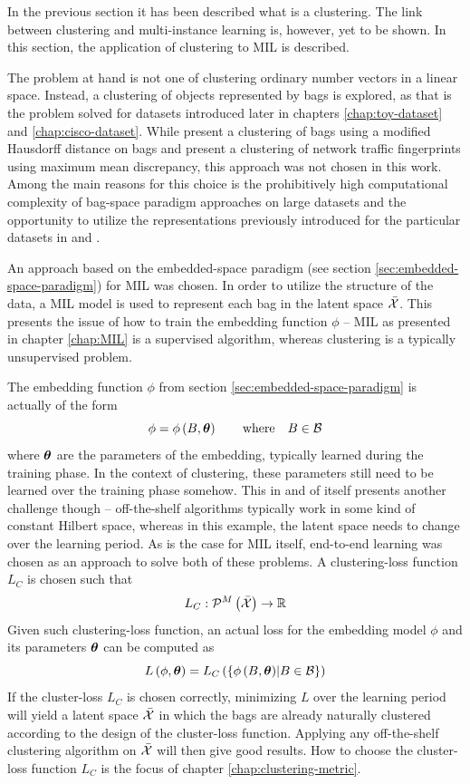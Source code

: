 In the previous section it has been described what is a clustering. The link between clustering and multi-instance learning is, however, yet to be shown. In this section, the application of clustering to MIL is described.

The problem at hand is not one of clustering ordinary number vectors in a linear space. Instead, a clustering of objects represented by bags is explored, as that is the problem solved for datasets introduced later in chapters \ref{chap:toy-dataset} and \ref{chap:cisco-dataset}. While \cite{wang_solving_2000} present a clustering of bags using a modified Hausdorff distance on bags and \cite{kohout_network_2018} present a clustering of network traffic fingerprints using maximum mean discrepancy, this approach was not chosen in this work. Among the main reasons for this choice is the prohibitively high computational complexity of bag-space paradigm approaches on large datasets and the opportunity to utilize the representations previously introduced for the particular datasets in \cite{dedic_hierarchicke_2017} and \cite{pevny_nested_2020}.

An approach based on the embedded-space paradigm (see section \ref{sec:embedded-space-paradigm}) for MIL was chosen. In order to utilize the structure of the data, a MIL model is used to represent each bag in the latent space \( \bar{\mathcal{X}} \). This presents the issue of how to train the embedding function \( \phi \) -- MIL as presented in chapter \ref{chap:MIL} is a supervised algorithm, whereas clustering is a typically unsupervised problem.

The embedding function \( \phi \) from section \ref{sec:embedded-space-paradigm} is actually of the form
\[ \phi = \phi \left( B, \bm{\theta} \right) \qquad \text{where} \quad B \in \mathcal{B} \]
where \( \bm{\theta} \) are the parameters of the embedding, typically learned during the training phase. In the context of clustering, these parameters still need to be learned over the training phase somehow. This in and of itself presents another challenge though -- off-the-shelf algorithms typically work in some kind of constant Hilbert space, whereas in this example, the latent space needs to change over the learning period. As is the case for MIL itself, end-to-end learning was chosen as an approach to solve both of these problems. A clustering-loss function \( L_C \) is chosen such that
\[ L_C: \mathcal{P}^M \left( \bar{\mathcal{X}} \right) \to \mathbb{R} \]
Given such clustering-loss function, an actual loss for the embedding model \( \phi \) and its parameters \( \bm{\theta} \) can be computed as
\[ L \left( \phi, \bm{\theta} \right) = L_C \left( \left\{ \phi \left( B, \bm{\theta} \right) \middle| B \in \mathcal{B} \right\} \right) \]
If the cluster-loss \( L_C \) is chosen correctly, minimizing \( L \) over the learning period will yield a latent space \( \bar{\mathcal{X}} \) in which the bags are already naturally clustered according to the design of the cluster-loss function. Applying any off-the-shelf clustering algorithm on \( \bar{\mathcal{X}} \) will then give good results. How to choose the cluster-loss function \( L_C \) is the focus of chapter \ref{chap:clustering-metric}.

